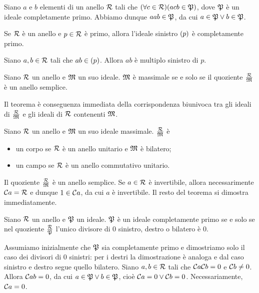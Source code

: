 \Proof Siano $a$ e $b$ elementi di un anello $\mathcal{R}$ tali che $(\forall c \in \mathcal{R})(acb \in \mathfrak{P})$, dove $\mathfrak{P}$ \`e un ideale completamente primo. Abbiamo dunque $aab \in \mathfrak{P}$, da cui $a \in \mathfrak{P} \vee b \in \mathfrak{P}$. \EndProof
\begin{Theorem}
	Se $\mathcal{R}$ \`e un anello e $p \in \mathcal{R}$ \`e primo, allora l'ideale sinistro $\left ( p \right )$ \`e completamente primo.
\end{Theorem}
\Proof Siano $a, b \in \mathcal{R}$ tali che $ab \in \left ( p \right )$. Allora $ab$ \`e multiplo sinistro di $p$. \EndProof
\begin{Theorem}
	Siano $\mathcal{R}$ un anello e $\mathfrak{M}$ un suo ideale. $\mathfrak{M}$ \`e massimale se e solo se il quoziente $\frac{\mathcal{R}}{\mathfrak{M}}$ \`e un anello semplice.
\end{Theorem}
\Proof Il teorema \`e conseguenza immediata della corrispondenza biunivoca tra gli ideali di $\frac{\mathcal{R}}{\mathfrak{M}}$ e gli ideali di $\mathcal{R}$ contenenti $\mathfrak{M}$.
\begin{Corollary}
	Siano $\mathcal{R}$ un anello e $\mathfrak{M}$ un suo ideale massimale. $\frac{\mathcal{R}}{\mathfrak{M}}$ \`e
	\begin{itemize}
		\item un corpo se $\mathcal{R}$ \`e un anello unitario e $\mathfrak{M}$ \`e bilatero;
		\item un campo se $\mathcal{R}$ \`e un anello commutativo unitario.
	\end{itemize}
\end{Corollary}
\Proof Il quoziente $\frac{\mathcal{R}}{\mathfrak{M}}$ \`e un anello semplice. Se $a \in \mathcal{R}$ \`e invertibile, allora necessarimente $\mathcal{C}{a} = \mathcal{R}$ e dunque $1 \in \mathcal{C}{a}$, da cui $a$ \`e invertibile. Il resto del teorema si dimostra immediatamente. \EndProof
\begin{Theorem}
	Siano $\mathcal{R}$ un anello e $\mathfrak{P}$ un ideale. $\mathfrak{P}$ \`e un ideale completamente primo se e solo se nel quoziente $\frac{\mathcal{R}}{\mathfrak{P}}$ l'unico divisore di $0$ sinistro, destro o bilatero \`e $0$.
\end{Theorem}
\Proof Assumiamo inizialmente che $\mathfrak{P}$ sia completamente primo e dimostriamo solo il caso dei divisori di $0$ sinistri: per i destri la dimostrazione \`e analoga e dal caso sinistro e destro segue quello bilatero. Siano $a, b \in \mathcal{R}$ tali che $\mathcal{C}{a} \mathcal{C}{b} = 0$ e $\mathcal{C}{b} \neq 0$. Allora $\mathcal{C}{ab} = 0$, da cui $a \in \mathfrak{P} \vee b \in \mathfrak{P}$, cio\`e $\mathcal{C}{a} = 0 \vee \mathcal{C}{b} = 0$. Necessariamente, $\mathcal{C}{a} = 0$.
